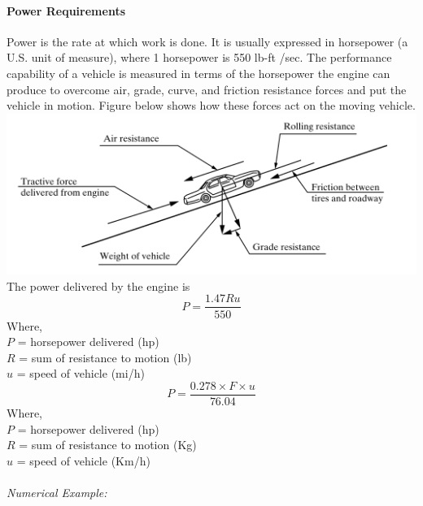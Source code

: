 \paragraph{Power Requirements}
Power is the rate at which work is done. It is usually expressed in horsepower (a U.S. unit of measure), where 1 horsepower is 550 lb-ft /sec. The performance capability of a vehicle is measured in terms of the horsepower the engine can produce to overcome air, grade, curve, and friction resistance forces and put the vehicle in motion. Figure below shows how these forces act on the moving vehicle.\\
\includegraphics[scale=0.9]{gfx/fig9.png}\\
The power delivered by the engine is
\begin{equation}
	P = \frac{1.47Ru}{550}
\end{equation}
Where,\\
\hspace*{10mm}$P$ = horsepower delivered (hp)\\
\hspace*{10mm}$R$ = sum of resistance to motion (lb)\\
\hspace*{10mm}$u$ = speed of vehicle (mi/h)
\begin{equation}
	P = \frac{0.278 \times F \times u}{76.04}
\end{equation}
Where,\\
\hspace*{10mm}$P$ = horsepower delivered (hp)\\
\hspace*{10mm}$R$ = sum of resistance to motion (Kg)\\
\hspace*{10mm}$u$ = speed of vehicle (Km/h)\\\\
\emph{Numerical Example:}\\
